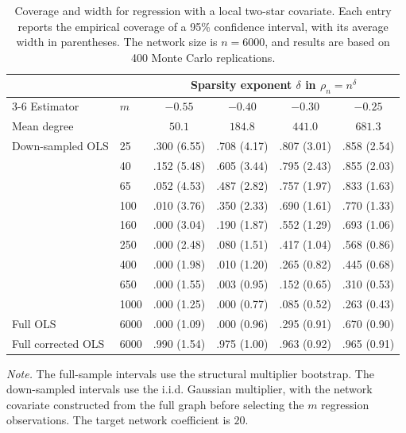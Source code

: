 
\begin{table}[t]
\centering
\caption{Coverage and width for regression with a local two-star covariate. Each entry reports the empirical coverage of a 95\% confidence interval, with its average width in parentheses. The network size is $n=6000$, and results are based on 400 Monte Carlo replications.}
\label{tab:twostar-downsampling-coverage-width}
\small
\setlength{\tabcolsep}{5pt}
\begin{tabular}{llcccc}
\toprule
&& \multicolumn{4}{c}{Sparsity exponent $\delta$ in $\rho_n=n^\delta$} \\
\cmidrule(lr){3-6}
Estimator & $m$ & $-0.55$ & $-0.40$ & $-0.30$ & $-0.25$ \\
Mean degree && $50.1$ & $184.8$ & $441.0$ & $681.3$ \\
\midrule
Down-sampled OLS & 25   & .300 (6.55) & .708 (4.17) & .807 (3.01) & .858 (2.54) \\
                 & 40   & .152 (5.48) & .605 (3.44) & .795 (2.43) & .855 (2.03) \\
                 & 65   & .052 (4.53) & .487 (2.82) & .757 (1.97) & .833 (1.63) \\
                 & 100  & .010 (3.76) & .350 (2.33) & .690 (1.61) & .770 (1.33) \\
                 & 160  & .000 (3.04) & .190 (1.87) & .552 (1.29) & .693 (1.06) \\
                 & 250  & .000 (2.48) & .080 (1.51) & .417 (1.04) & .568 (0.86) \\
                 & 400  & .000 (1.98) & .010 (1.20) & .265 (0.82) & .445 (0.68) \\
                 & 650  & .000 (1.55) & .003 (0.95) & .152 (0.65) & .310 (0.53) \\
                 & 1000 & .000 (1.25) & .000 (0.77) & .085 (0.52) & .263 (0.43) \\
\midrule
Full OLS           & 6000 & .000 (1.09) & .000 (0.96) & .295 (0.91) & .670 (0.90) \\
Full corrected OLS & 6000 & .990 (1.54) & .975 (1.00) & .963 (0.92) & .965 (0.91) \\
\bottomrule
\end{tabular}
\begin{minipage}{0.96\linewidth}
\footnotesize\vspace{2pt}
\textit{Note.} The full-sample intervals use the structural multiplier bootstrap. The down-sampled intervals use the i.i.d. Gaussian multiplier, with the network covariate constructed from the full graph before selecting the $m$ regression observations. The target network coefficient is $20$.
\end{minipage}
\end{table}

